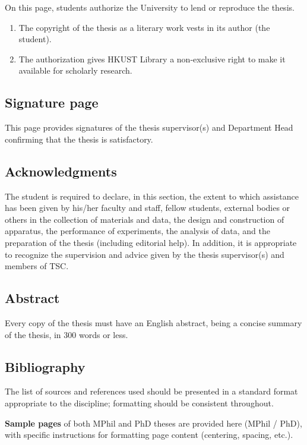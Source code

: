 On this page, students authorize the University to lend or reproduce the thesis.

\begin{enumerate}
  \item The copyright of the thesis as a literary work vests in its author (the student).
  \item The authorization gives HKUST Library a non-exclusive right to make it available for scholarly research.
\end{enumerate}

\subsection{Signature page}

This page provides signatures of the thesis supervisor(s) and Department Head confirming that the thesis is satisfactory.

\subsection{Acknowledgments}

The student is required to declare, in this section, the extent to which assistance has been given by his/her faculty and staff, fellow students, external bodies or others in the collection of materials and data, the design and construction of apparatus, the performance of experiments, the analysis of data, and the preparation of the thesis (including editorial help). In addition, it is appropriate to recognize the supervision and advice given by the thesis supervisor(s) and members of TSC.

\subsection{Abstract}

Every copy of the thesis must have an English abstract, being a concise summary of the thesis, in 300 words or less.

\subsection{Bibliography}

The list of sources and references used should be presented in a standard format appropriate to the discipline; formatting should be consistent throughout.

\textbf{Sample pages} of both MPhil and PhD theses are provided here (MPhil / PhD), with specific instructions for formatting page content (centering, spacing, etc.).

